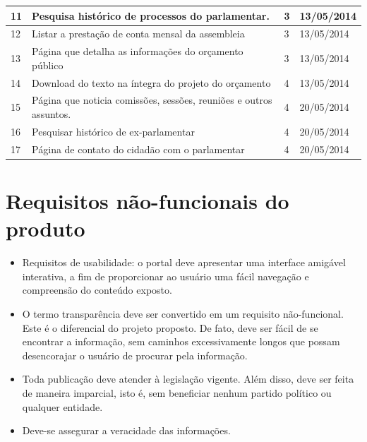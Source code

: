 \documentclass[12pt, a4paper]{article}
\begin{document}
\begin{longtabu}{X[-1, r] | X | X[-1, r] | X[-1]}
            11 &
            Pesquisa histórico de processos do parlamentar. &
            3 & 13/05/2014
            \\ \hline

            12 &
            Listar a prestação de conta mensal da assembleia &
            3 & 13/05/2014
            \\ \hline

            13 &
            Página que detalha as informações do orçamento público &
            3 & 13/05/2014
            \\ \hline

            14 &
            Download do texto na íntegra do projeto do orçamento &
            4 & 13/05/2014
            \\ \hline

            15 &
            Página que noticia comissões, sessões, reuniões e outros assuntos.
            &
            4 & 20/05/2014
            \\ \hline

            16 &
            Pesquisar histórico de ex-parlamentar &
            4 & 20/05/2014
            \\ \hline

            17 &
            Página de contato do cidadão com o parlamentar &
            4 & 20/05/2014
            \\ \hline
            
            
        \end{longtabu}

    \section{Requisitos não-funcionais do produto}
    \begin{itemize}
        \item
        Requisitos de usabilidade: o portal deve apresentar uma interface
        amigável interativa, a fim de proporcionar ao usuário uma fácil
        navegação e compreensão do conteúdo exposto.
        \item
        O termo transparência deve ser convertido em um requisito
        não-funcional. Este é o diferencial do projeto proposto. De fato, deve
        ser fácil de se encontrar a informação, sem caminhos excessivamente
        longos que possam desencorajar o usuário de procurar pela informação.
        \item
        Toda publicação deve atender à legislação vigente. Além disso, deve ser
        feita de maneira imparcial, isto é, sem beneficiar nenhum partido
        político ou qualquer entidade.
        \item
        Deve-se assegurar a veracidade das informações.
    \end{itemize}
\end{document}
